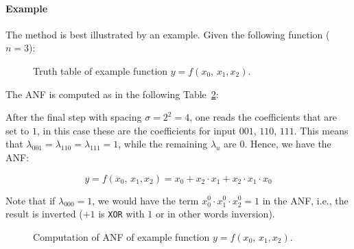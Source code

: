 \paragraph{Example}
The method is best illustrated by an example. Given the following function ($n = 3$):

\begin{figure}[h!tb]
		\center
		
		\caption{Truth table of example function $y = f\left(x_0,\,x_1, x_2\right)$.}
		\label{fig:symmetric_crypto:anf_tt}
\end{figure} 

The \ac{ANF} is computed as in the following Table~\ref{fig:symmetric_crypto:anf_tt_comp}:

After the final step with spacing $\sigma = 2^2 = 4$, one reads the coefficients that are set to $1$, in this case these are the coefficients for input $001$, $110$, $111$. This means that $\lambda_{001} = \lambda_{110} = \lambda_{111} = 1$, while the remaining $\lambda_u$ are $0$. Hence, we have the \ac{ANF}:

$$
y = f\left(x_0,\,x_1, x_2\right) = x_0 + x_2 \cdot x_1 + x_2 \cdot x_1 \cdot x_0
$$

Note that if $\lambda_{000} = 1$, we would have the term $x_0^0 \cdot x_1^0 \cdot x_2^0 = 1$ in the \ac{ANF}, i.e., the result is inverted ($+1$ is \verb+XOR+ with $1$ or in other words inversion).  

\begin{figure}[h!tb]
		\center
		
		\caption{Computation of \ac{ANF} of example function $y = f\left(x_0,\,x_1, x_2\right)$.}
		\label{fig:symmetric_crypto:anf_tt_comp}
\end{figure} 









